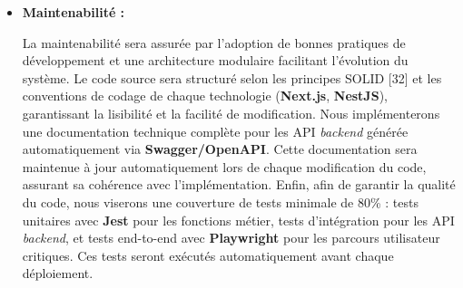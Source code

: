 \begin{itemize}[label=$\blacktriangleright$]
\item \textbf{Maintenabilité :}

La maintenabilité sera assurée par l'adoption de bonnes pratiques de développement et une architecture modulaire facilitant l'évolution du système. Le code source sera structuré selon les principes SOLID [32] et les conventions de codage de chaque technologie (\textbf{Next.js}, \textbf{NestJS}), garantissant la lisibilité et la facilité de modification.
\newline
Nous implémenterons une documentation technique complète pour les API \textit{backend} générée automatiquement via \textbf{Swagger/OpenAPI}. Cette documentation sera maintenue à jour automatiquement lors de chaque modification du code, assurant sa cohérence avec l'implémentation.
\newline
Enfin, afin de garantir la qualité du code, nous viserons une couverture de tests minimale de 80\% : tests unitaires avec \textbf{Jest} pour les fonctions métier, tests d'intégration pour les API \textit{backend}, et tests end-to-end avec \textbf{Playwright} pour les parcours utilisateur critiques. Ces tests seront exécutés automatiquement avant chaque déploiement.
\end{itemize}
